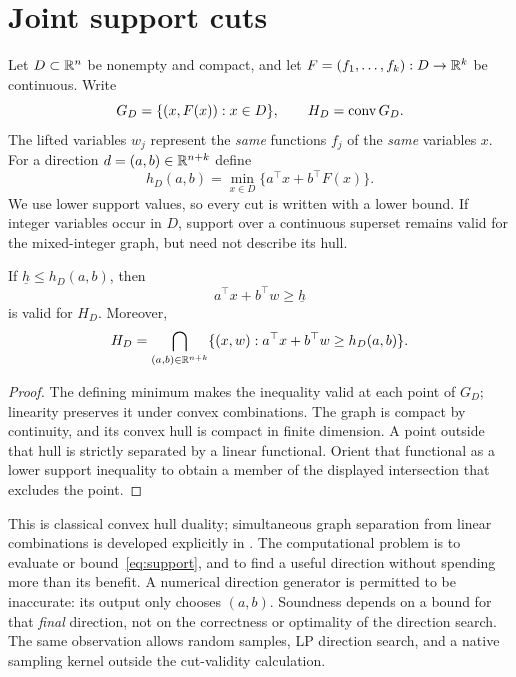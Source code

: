 \section{Joint support cuts}\label{sec:support}

Let $D\subset\mathbb R^n$ be nonempty and compact, and let
$F=(f_1,\ldots,f_k):D\to\mathbb R^k$ be continuous. Write
\[
G_D=\{(x,F(x)):x\in D\},\qquad H_D=\operatorname{conv} G_D.
\]
The lifted variables $w_j$ represent the \emph{same} functions $f_j$ of
the \emph{same} variables $x$. For a direction $d=(a,b)\in\mathbb R^{n+k}$ define
\begin{equation}\label{eq:support}
h_D(a,b)=\min_{x\in D}\{a^\top x+b^\top F(x)\}.
\end{equation}
We use lower support values, so every cut is written with a lower bound.
If integer variables occur in $D$, support over a continuous superset
remains valid for the mixed-integer graph, but need not describe its hull.

\begin{proposition}\label{prop:support}
If $\underline h\le h_D(a,b)$, then
\begin{equation}\label{eq:cut}
a^\top x+b^\top w\ge\underline h
\end{equation}
is valid for $H_D$. Moreover,
\[
H_D=\bigcap_{(a,b)\in\mathbb R^{n+k}}
\{(x,w):a^\top x+b^\top w\ge h_D(a,b)\}.
\]
\end{proposition}
\begin{proof}
The defining minimum makes the inequality valid at each point of $G_D$;
linearity preserves it under convex combinations. The graph is compact
by continuity, and its convex hull is compact in finite dimension. A point
outside that hull is strictly separated by a linear functional. Orient
that functional as a lower support inequality to obtain a member of the
displayed intersection that excludes the point.
\end{proof}

This is classical convex hull duality; simultaneous graph separation
from linear combinations is developed explicitly in
\cite{LiersEtAl2021,Tawarmalani2010}. The computational problem is to
evaluate or bound~\eqref{eq:support}, and to find a useful direction
without spending more than its benefit. A numerical direction generator
is permitted to be inaccurate: its output only chooses $(a,b)$.
Soundness depends on a bound for that \emph{final} direction, not on the
correctness or optimality of the direction search. The same observation
allows random samples, LP direction search, and a native sampling kernel
outside the cut-validity calculation.


